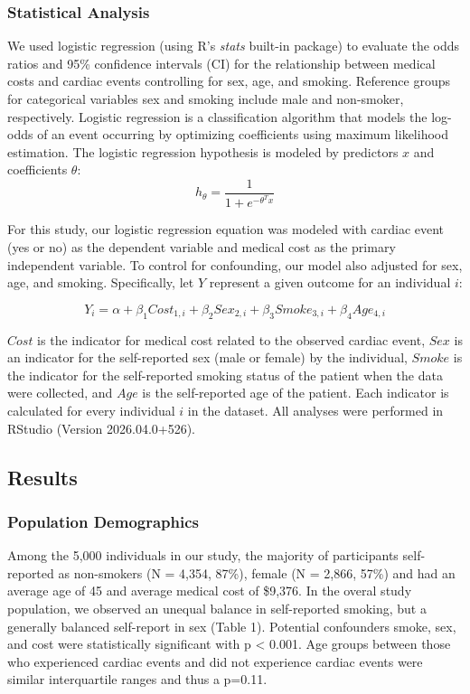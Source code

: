 \documentclass[
  letterpaper,
  DIV=11,
  numbers=noendperiod]{scrartcl}
\begin{document}
\subsubsection{Statistical Analysis}\label{statistical-analysis}

We used logistic regression (using R's \emph{stats} built-in package) to
evaluate the odds ratios and 95\% confidence intervals (CI) for the
relationship between medical costs and cardiac events controlling for
sex, age, and smoking. Reference groups for categorical variables sex
and smoking include male and non-smoker, respectively. Logistic
regression is a classification algorithm that models the log-odds of an
event occurring by optimizing coefficients using maximum likelihood
estimation. The logistic regression hypothesis is modeled by predictors
\(x\) and coefficients \(\theta\):
\[h_{\theta} = \frac{1}{1 + e^{-\theta^Tx}}\]

For this study, our logistic regression equation was modeled with
cardiac event (yes or no) as the dependent variable and medical cost as
the primary independent variable. To control for confounding, our model
also adjusted for sex, age, and smoking. Specifically, let \(Y\)
represent a given outcome for an individual \(i\):

\[Y_i = \alpha + \beta_1Cost_{1,i} + \beta_2Sex_{2,i} + \beta_3Smoke_{3,i} + \beta_4Age_{4,i}\]

\(Cost\) is the indicator for medical cost related to the observed
cardiac event, \(Sex\) is an indicator for the self-reported sex (male
or female) by the individual, \(Smoke\) is the indicator for the
self-reported smoking status of the patient when the data were
collected, and \(Age\) is the self-reported age of the patient. Each
indicator is calculated for every individual \(i\) in the dataset. All
analyses were performed in RStudio (Version 2026.04.0+526).

\subsection{Results}\label{results}

\subsubsection{Population Demographics}\label{population-demographics}

Among the 5,000 individuals in our study, the majority of participants
self-reported as non-smokers (N = 4,354, 87\%), female (N = 2,866, 57\%)
and had an average age of 45 and average medical cost of \$9,376. In the
overal study population, we observed an unequal balance in self-reported
smoking, but a generally balanced self-report in sex (Table 1).
Potential confounders smoke, sex, and cost were statistically
significant with p \textless{} 0.001. Age groups between those who
experienced cardiac events and did not experience cardiac events were
similar interquartile ranges and thus a p=0.11.
\end{document}

